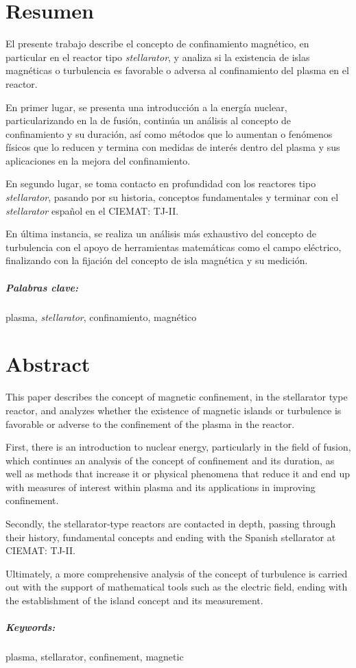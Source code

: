 \chapter*{Resumen}
El presente trabajo describe el concepto de confinamiento magnético, en particular en el reactor tipo \textit{stellarator}, y analiza si la existencia de islas magnéticas o turbulencia es favorable o adversa
al confinamiento del plasma en el reactor.\par
En primer lugar, se presenta una introducción a la energía nuclear, particularizando en la de fusión, continúa
un análisis al concepto de confinamiento y su duración, así como métodos que lo aumentan o fenómenos físicos que lo reducen y termina con medidas
de interés dentro del plasma y sus aplicaciones en la mejora del confinamiento.\par
En segundo lugar, se toma contacto en profundidad con los reactores tipo \textit{stellarator}, pasando por su historia, 
conceptos fundamentales y terminar con el \textit{stellarator} español en el CIEMAT: TJ-II.\par
En última instancia, se realiza un análisis más exhaustivo del concepto de turbulencia con el apoyo
de herramientas matemáticas como el campo eléctrico, finalizando con la fijación del concepto de isla
magnética y su medición.\par
\paragraph{Palabras clave:} plasma, \textit{stellarator}, confinamiento, magnético
\chapter*{Abstract}
This paper describes the concept of magnetic confinement, in the stellarator type reactor, and analyzes whether the existence of magnetic islands or turbulence is favorable or adverse
to the confinement of the plasma in the reactor.\par
First, there is an introduction to nuclear energy, particularly in the field of fusion, which continues 
an analysis of the concept of confinement and its duration, as well as methods that increase it or physical 
phenomena that reduce it and end up with measures of interest within plasma and its applications in improving confinement.\par
Secondly, the stellarator-type reactors are contacted in depth, passing through their history, 
fundamental concepts and ending with the Spanish stellarator at CIEMAT: TJ-II.\par
Ultimately, a more comprehensive analysis of the concept of turbulence is carried out with the support
of mathematical tools such as the electric field, ending with the establishment of the island concept
and its measurement.\par
\paragraph{Keywords:} plasma, stellarator, confinement, magnetic